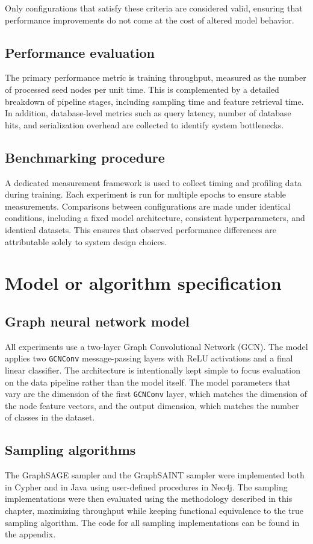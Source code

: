 \documentclass[PhD]{uclathes}
\begin{document}
Only configurations that satisfy these criteria are considered valid, ensuring
that performance improvements do not come at the cost of altered model
behavior.

\subsection{Performance evaluation}
The primary performance metric is training throughput, measured as the number
of processed seed nodes per unit time. This is complemented by a detailed
breakdown of pipeline stages, including sampling time and feature retrieval
time. In addition, database-level metrics such as query latency, number of
database hits, and serialization overhead are collected to identify system
bottlenecks.

\subsection{Benchmarking procedure}
A dedicated measurement framework is used to collect timing and profiling data
during training. Each experiment is run for multiple epochs to ensure stable
measurements. Comparisons between configurations are made under identical
conditions, including a fixed model architecture, consistent hyperparameters,
and identical datasets. This ensures that observed performance differences are
attributable solely to system design choices.

\section{Model or algorithm specification}
\subsection{Graph neural network model}\label{sec:model}
All experiments use a two-layer Graph Convolutional Network (GCN). The model
applies two \texttt{GCNConv} message-passing layers with ReLU activations and a
final linear classifier. The architecture is intentionally kept simple to focus
evaluation on the data pipeline rather than the model itself. The model
parameters that vary are the dimension of the first \texttt{GCNConv} layer,
which matches the dimension of the node feature vectors, and the output
dimension, which matches the number of classes in the dataset.

\subsection{Sampling algorithms}\label{sec:sampling_algs}
The GraphSAGE sampler and the GraphSAINT sampler were implemented both in
Cypher and in Java using user-defined procedures in Neo4j. The sampling
implementations were then evaluated using the methodology described in this
chapter, maximizing throughput while keeping functional equivalence to the true
sampling algorithm. The code for all sampling implementations can be found in
the appendix.
\end{document}
